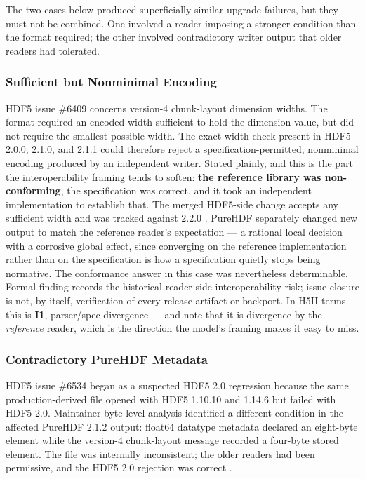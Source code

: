 \documentclass[../main.tex]{subfiles}
\begin{document}
The two cases below produced superficially similar upgrade failures, but they
must not be combined. One involved a reader imposing a stronger condition than
the format required; the other involved contradictory writer output that older
readers had tolerated.

\subsubsection{Sufficient but Nonminimal Encoding}

HDF5 issue \#6409 concerns version-4 chunk-layout dimension widths. The format
required an encoded width sufficient to hold the dimension value, but did not
require the smallest possible width. The exact-width check present in HDF5
2.0.0, 2.1.0, and 2.1.1 could therefore reject a specification-permitted,
nonminimal encoding produced by an independent writer. Stated plainly, and this
is the part the interoperability framing tends to soften: \textbf{the reference
library was non-conforming}, the specification was correct, and it took an
independent implementation to establish that. The merged HDF5-side
change accepts any sufficient width and was tracked against 2.2.0
\cite{hdf5-gh-issue-6409,hdf5-gh-pr-6432}. PureHDF separately changed new
output to match the reference reader's expectation
\cite{purehdf-gh-issue-168,purehdf-pr-160} --- a rational local decision with a
corrosive global effect, since converging on the reference implementation
rather than on the specification is how a specification quietly stops being
normative. The conformance answer in this case was nevertheless determinable.
Formal finding  records the historical reader-side
interoperability risk; issue closure is not, by itself, verification of every
release artifact or backport. In H5II terms this is \textbf{I1}, parser/spec
divergence --- and note that it is divergence by the \emph{reference} reader,
which is the direction the model's framing makes it easy to miss.

\subsubsection{Contradictory PureHDF Metadata}

HDF5 issue \#6534 began as a suspected HDF5 2.0 regression because the same
production-derived file opened with HDF5 1.10.10 and 1.14.6 but failed with
HDF5 2.0. Maintainer byte-level analysis identified a different condition in
the affected PureHDF 2.1.2 output: float64 datatype metadata declared an
eight-byte element while the version-4 chunk-layout message recorded a
four-byte stored element. The file was internally inconsistent; the older
readers had been permissive, and the HDF5 2.0 rejection was correct
\cite{hdf5-gh-issue-6534,purehdf-gh-issue-164}.
\end{document}
